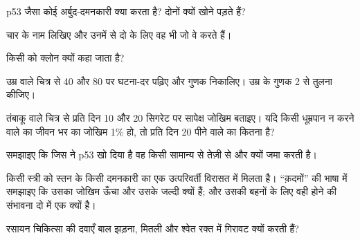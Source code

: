\begin{exercise}[$\star$]\label{exo:g11:cancer:3}
p53 जैसा कोई अर्बुद-दमनकारी  क्या करता है? दोनों  क्यों खोने
पड़ते हैं?
\end{exercise}

\begin{exercise}[$\star$]\label{exo:g11:cancer:4}
चार  के नाम लिखिए और उनमें से दो के लिए वह  भी जो वे करते हैं।
\end{exercise}

\begin{exercise}[$\star$]\label{exo:g11:cancer:5}
किसी  को क्लोन क्यों कहा जाता है?
\end{exercise}

\begin{exercise}[$\star\star$]\label{exo:g11:cancer:6}
उम्र वाले चित्र से 40 और 80 पर घटना-दर पढ़िए और गुणक निकालिए। उम्र के
गुणक 2 से तुलना कीजिए।
\end{exercise}

\begin{exercise}[$\star\star$]\label{exo:g11:cancer:7}
तंबाकू वाले चित्र से प्रति दिन 10 और 20 सिगरेट पर सापेक्ष जोखिम बताइए।
यदि किसी धूम्रपान न करने वाले का जीवन भर का जोखिम 1\% हो, तो प्रति दिन 20
पीने वाले का कितना है?
\end{exercise}

\begin{exercise}[$\star\star$]\label{exo:g11:cancer:8}
समझाइए कि जिस  ने p53 खो दिया है वह किसी सामान्य  से तेज़ी से
और  क्यों जमा करती है।
\end{exercise}

\begin{exercise}[$\star\star$]\label{exo:g11:cancer:9}
किसी स्त्री को स्तन  के किसी दमनकारी  का एक उत्परिवर्ती 
विरासत में मिलता है। ``क़दमों'' की भाषा में समझाइए कि उसका जोखिम ऊँचा और
उसके  जल्दी क्यों हैं; और उसकी बहनों के लिए वही होने की संभावना दो
में एक क्यों है।
\end{exercise}

\begin{exercise}[$\star\star$]\label{exo:g11:cancer:10}
रसायन चिकित्सा की दवाएँ बाल झड़ना, मितली और श्वेत रक्त  में गिरावट
क्यों करती हैं?
\end{exercise}

